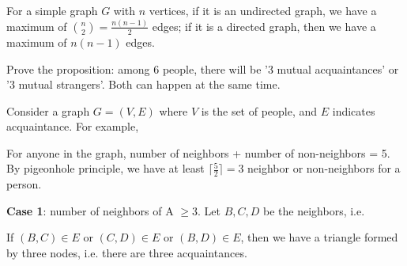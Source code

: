 For a simple graph \(G\) with \(n\) vertices, if it is an undirected graph, we have a maximum of \(\binom{n}{2} = \frac{n(n-1)}{2}\) edges; if it is a directed graph, then we have a maximum of \(n(n-1)\) edges. 

\begin{eg}
  Prove the proposition: among 6 people, there will be '3 mutual acquaintances' or '3 mutual strangers'. Both can happen at the same time. 

  Consider a graph \(G = (V, E)\) where \(V\) is the set of people, and \(E\) indicates acquaintance. For example,
  \begin{figure}[H]
    \centering
  \end{figure}
  For anyone in the graph, number of neighbors + number of non-neighbors = 5.
  By pigeonhole principle, we have at least \(\lceil \frac{5}{2} \rceil = 3\) neighbor or non-neighbors for a person.  

  \textbf{Case 1}: number of neighbors of A \(\geq 3\). Let \(B, C, D\) be the neighbors, i.e. 
  \begin{figure}[H]
    \centering
  \end{figure}
  If \((B, C) \in E\) or \((C, D) \in E\) or \((B, D) \in E\), then we have a triangle formed by three nodes, i.e. there are three acquaintances. 


\end{eg}
